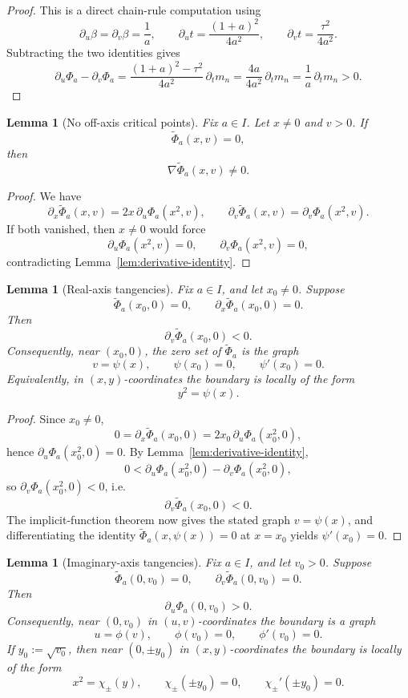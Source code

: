 \documentclass[11pt]{article}
\newtheorem{lemma}[theorem]{Lemma}
\begin{document}
\begin{proof}
This is a direct chain-rule computation using
\[
\partial_u\beta=\partial_v\beta=\frac1a,
\qquad
\partial_u t=\frac{(1+a)^2}{4a^2},
\qquad
\partial_v t=\frac{\tau^2}{4a^2}.
\]
Subtracting the two identities gives
\[
\partial_u\Phi_a-\partial_v\Phi_a
=
\frac{(1+a)^2-\tau^2}{4a^2}\,\partial_t m_n
=
\frac{4a}{4a^2}\,\partial_t m_n
=
\frac1a\,\partial_t m_n>0.
\]
\end{proof}

\begin{lemma}[No off-axis critical points]\label{lem:no-off-axis-critical}
Fix \(a\in I\). Let \(x\neq 0\) and \(v>0\). If
\[
\widetilde\Phi_a(x,v)=0,
\]
then
\[
\nabla \widetilde\Phi_a(x,v)\neq 0.
\]
\end{lemma}

\begin{proof}
We have
\[
\partial_x\widetilde\Phi_a(x,v)=2x\,\partial_u\Phi_a(x^2,v),
\qquad
\partial_v\widetilde\Phi_a(x,v)=\partial_v\Phi_a(x^2,v).
\]
If both vanished, then \(x\neq 0\) would force
\[
\partial_u\Phi_a(x^2,v)=0,
\qquad
\partial_v\Phi_a(x^2,v)=0,
\]
contradicting Lemma~\ref{lem:derivative-identity}.
\end{proof}

\begin{lemma}[Real-axis tangencies]\label{lem:real-axis-tangency}
Fix \(a\in I\), and let \(x_0\neq 0\). Suppose
\[
\widetilde\Phi_a(x_0,0)=0,
\qquad
\partial_x\widetilde\Phi_a(x_0,0)=0.
\]
Then
\[
\partial_v\widetilde\Phi_a(x_0,0)<0.
\]
Consequently, near \((x_0,0)\), the zero set of \(\widetilde\Phi_a\) is the graph
\[
v=\psi(x),
\qquad
\psi(x_0)=0,
\qquad
\psi'(x_0)=0.
\]
Equivalently, in \((x,y)\)-coordinates the boundary is locally of the form
\[
y^2=\psi(x).
\]
\end{lemma}

\begin{proof}
Since \(x_0\neq 0\),
\[
0=\partial_x\widetilde\Phi_a(x_0,0)=2x_0\,\partial_u\Phi_a(x_0^2,0),
\]
hence \(\partial_u\Phi_a(x_0^2,0)=0\). By Lemma~\ref{lem:derivative-identity},
\[
0<\partial_u\Phi_a(x_0^2,0)-\partial_v\Phi_a(x_0^2,0),
\]
so \(\partial_v\Phi_a(x_0^2,0)<0\), i.e.
\[
\partial_v\widetilde\Phi_a(x_0,0)<0.
\]
The implicit-function theorem now gives the stated graph \(v=\psi(x)\), and differentiating the identity \(\widetilde\Phi_a(x,\psi(x))=0\) at \(x=x_0\) yields \(\psi'(x_0)=0\).
\end{proof}

\begin{lemma}[Imaginary-axis tangencies]\label{lem:imag-axis-tangency}
Fix \(a\in I\), and let \(v_0>0\). Suppose
\[
\widetilde\Phi_a(0,v_0)=0,
\qquad
\partial_v\widetilde\Phi_a(0,v_0)=0.
\]
Then
\[
\partial_u\Phi_a(0,v_0)>0.
\]
Consequently, near \((0,v_0)\) in \((u,v)\)-coordinates the boundary is a graph
\[
u=\phi(v),
\qquad
\phi(v_0)=0,
\qquad
\phi'(v_0)=0.
\]
If \(y_0:=\sqrt{v_0}\), then near \((0,\pm y_0)\) in \((x,y)\)-coordinates the boundary is locally of the form
\[
x^2=\chi_\pm(y),
\qquad
\chi_\pm(\pm y_0)=0,
\qquad
\chi_\pm'(\pm y_0)=0.
\]
\end{lemma}
\end{document}

